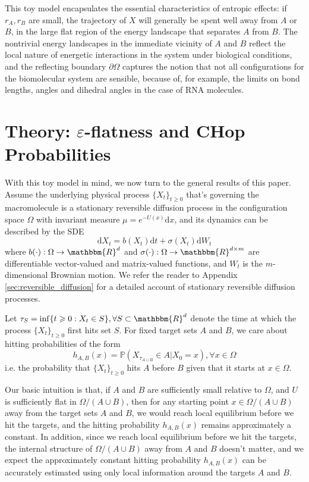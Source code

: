 \documentclass[english, aip, jcp, priprint, graphicx]{revtex4-1}
\theoremstyle{plain}
\theoremstyle{definition}
\theoremstyle{plain}
\begin{document}
This toy model encapsulates the essential characteristics of entropic effects: if $r_A, r_B$ are small, the trajectory of $X$ will generally be spent well away from $A$ or $B$, in the large flat region of the energy landscape that separates $A$ from $B$. The nontrivial energy landscapes in the immediate vicinity of $A$ and $B$ reflect the local nature of energetic interactions in the system under biological conditions, and the reflecting boundary $\partial\Omega$ captures the notion that not all configurations for the biomolecular system are sensible, because of, for example, the limits on bond lengths, angles and dihedral angles in the case of RNA molecules.

\section{Theory: $\varepsilon$-flatness and CHop Probabilities}\label{sec:model_formulation}

With this toy model in mind, we now turn to the general results of this paper. Assume the underlying physical process $\{X_t\}_{t \geqslant
0}$ that's governing the macromolecule is a stationary reversible diffusion process in the configuration space $\Omega$ with invariant
measure ${\mu}= e^{- U (x)} \mathrm{d} x$, and its dynamics can be described by the SDE
\begin{equation}\label{equ:general_sde}\mathrm{d} X_t = b (X_t) \mathrm{d} t + \sigma (X_t) \mathrm{d} W_t \end{equation}
where $b (\cdot) : \Omega \rightarrow \mathbbm{R}^d$ and $\sigma (\cdot) :
\Omega \rightarrow \mathbbm{R}^{d \times m}$ are differentiable vector-valued
and matrix-valued functions, and $W_t$ is the $m$-dimensional Brownian motion. We refer the reader to Appendix \ref{sec:reversible_diffusion} for a detailed account of stationary reversible diffusion processes.

Let $ \tau_S = \inf \{ t \geqslant 0 : X_t \in S \}, \forall S \subset \mathbbm{R}^d $ denote the time at which the process $\{X_t\}_{t \geq 0}$ first hits set $S$. For fixed target sets $A$ and $B$, we care about hitting probabilities of the form 
\[ h_{A, B}(x) = \mathbb{P}(X_{\tau_{A\cup B}}\in A|X_0=x), \forall x\in \Omega\]
i.e. the probability that $\{X_t\}_{t \geq 0}$ hits $A$ before $B$ given that it starts at $x\in\Omega$. 

Our basic intuition is that, if $A$ and $B$ are sufficiently small relative to $\Omega$, and $U$ is sufficiently flat in $\Omega / (A\cup B)$, then for any starting point $x\in \Omega / (A\cup B)$ away from the target sets $A$ and $B$, we would reach local equilibrium before we hit the targets, and the hitting probability $h_{A, B}(x)$ remains approximately a constant. In addition, since we reach local equilibrium before we hit the targets, the internal structure of $\Omega / (A\cup B)$ away from $A$ and $B$ doesn't matter, and we expect the approximately constant hitting probability $h_{A, B}(x)$ can be accurately estimated using only local information around the targets $A$ and $B$.
\end{document}

